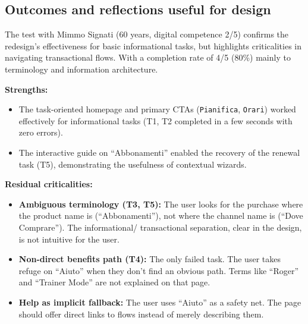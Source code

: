 ﻿\documentclass[11pt,a4paper]{article}
\begin{document}
\subsection*{Outcomes and reflections useful for design}
\begin{tcolorbox}[base]
The test with Mimmo Signati (60 years, digital competence
2/5) confirms the redesign's effectiveness for basic informational
tasks, but highlights criticalities in navigating transactional
flows. With a completion rate of 4/5 (80\%)
mainly to terminology and information architecture.

\medskip

\noindent\textbf{Strengths:}
\begin{itemize}[leftmargin=*]
  \item The task-oriented homepage and primary CTAs
  (\texttt{Pianifica}, \texttt{Orari}) worked
  effectively for informational tasks (T1, T2 completed
  in a few seconds with zero errors).
  \item The interactive guide on ``Abbonamenti'' enabled
  the recovery of the renewal task (T5), demonstrating the usefulness
  of contextual wizards.
\end{itemize}

\medskip

\noindent\textbf{Residual criticalities:}
\begin{itemize}[leftmargin=*]
  \item \textbf{Ambiguous terminology (T3, T5):} The user
  looks for the purchase where the product name is
  (``Abbonamenti''), not where the channel name is
  (``Dove Comprare''). The informational/
  transactional separation, clear in the design, is not intuitive for
  the user.
  \item \textbf{Non-direct benefits path (T4):}
  The only failed task. The user takes refuge on ``Aiuto''
  when they don't find an obvious path. Terms like
  ``Roger'' and ``Trainer Mode'' are not explained on that
  page.
  \item \textbf{Help as implicit fallback:} The user
  uses ``Aiuto'' as a safety net. The page should
  offer direct links to flows instead of merely
  describing them.
\end{itemize}

\medskip


\end{tcolorbox}
\end{document}
